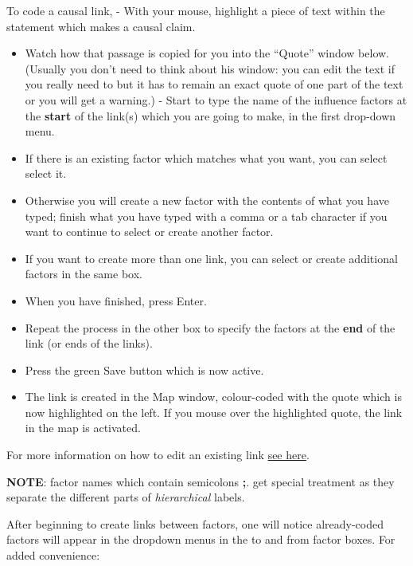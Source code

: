 \documentclass[
]{book}
\begin{document}
To code a causal link, - With your mouse, highlight a piece of text within the statement which makes a causal claim.

\begin{itemize}
\item
  Watch how that passage is copied for you into the ``Quote'' window below. (Usually you don't need to think about his window: you can edit the text if you really need to but it has to remain an exact quote of one part of the text or you will get a warning.) - Start to type the name of the influence factors at the \textbf{start} of the link(s) which you are going to make, in the first drop-down menu.
\item
  If there is an existing factor which matches what you want, you can select select it.
\item
  Otherwise you will create a new factor with the contents of what you have typed; finish what you have typed with a comma or a tab character if you want to continue to select or create another factor.
\item
  If you want to create more than one link, you can select or create additional factors in the same box.
\item
  When you have finished, press Enter.
\item
  Repeat the process in the other box to specify the factors at the \textbf{end} of the link (or ends of the links).
\item
  Press the green Save button which is now active.
\item
  The link is created in the Map window, colour-coded with the quote which is now highlighted on the left. If you mouse over the highlighted quote, the link in the map is activated.
\end{itemize}

For more information on how to edit an existing link \protect\hyperlink{xedit-factor-and-links}{see here}.

\textbf{NOTE}: factor names which contain semicolons \textbf{;}. get special treatment as they separate the different parts of \emph{hierarchical} labels.

After beginning to create links between factors, one will notice already-coded factors will appear in the dropdown menus in the to and from factor boxes. For added convenience:
\end{document}
